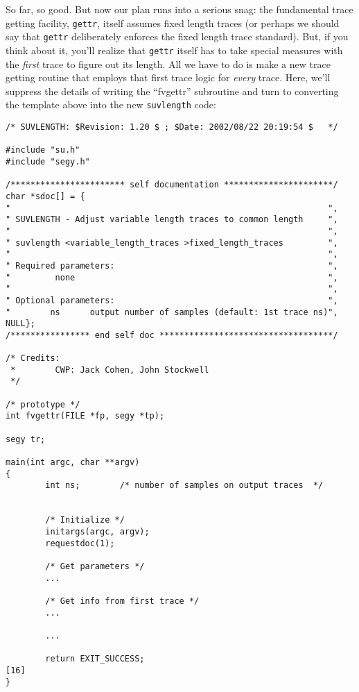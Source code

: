{{{{{{{So far, so good.  But now our plan runs into a serious snag: the
fundamental trace getting facility, {\tt gettr}, itself assumes fixed
length traces (or perhaps we should say that {\tt gettr} deliberately
enforces the fixed length trace standard).  But, if you think about
it, you'll realize that {\tt gettr} itself has to take special measures
with the {\em first} trace to figure out its length.  All we have to do
is make a new trace getting routine that employs that first trace
logic for {\em every} trace.  Here, we'll suppress the details of
writing the ``fvgettr'' subroutine and turn to converting the
template above into the new {\tt suvlength} code:

{\small\begin{verbatim}
/* SUVLENGTH: $Revision: 1.20 $ ; $Date: 2002/08/22 20:19:54 $   */

#include "su.h"
#include "segy.h"

/*********************** self documentation **********************/
char *sdoc[] = {
"                                                                ",
" SUVLENGTH - Adjust variable length traces to common length     ",
"                                                                ",
" suvlength <variable_length_traces >fixed_length_traces         ",
"                                                                ",
" Required parameters:                                           ",
"         none                                                   ",
"                                                                ",
" Optional parameters:                                           ",
"        ns      output number of samples (default: 1st trace ns)",
NULL};
/**************** end self doc ***********************************/

/* Credits:
 *        CWP: Jack Cohen, John Stockwell
 */

/* prototype */
int fvgettr(FILE *fp, segy *tp);

segy tr;

main(int argc, char **argv)
{
        int ns;        /* number of samples on output traces  */


        /* Initialize */                 
        initargs(argc, argv);
        requestdoc(1);
 
        /* Get parameters */
        ...
        
        /* Get info from first trace */
        ...

        ...

        return EXIT_SUCCESS;                                          [16]
}


\end{verbatim}}}}}}}}}
